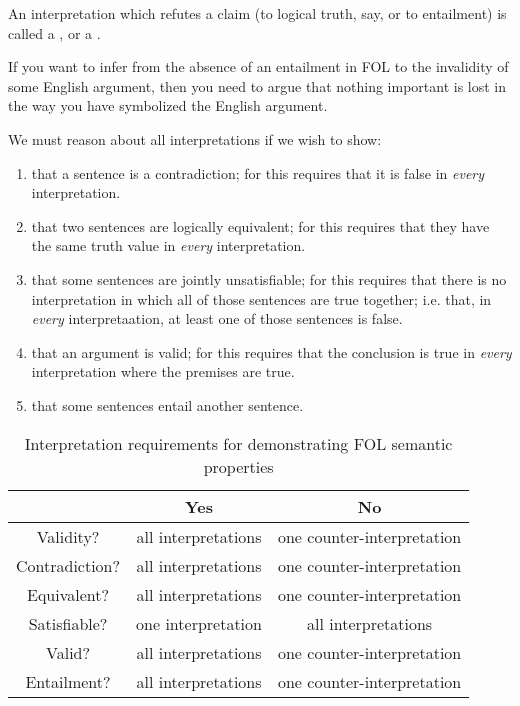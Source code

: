 \begin{definition}
    An interpretation which refutes a claim (to logical truth, say, or to entailment) is called a , or a .
\end{definition}

\begin{remark}
    If you want to infer from the absence of an entailment in FOL to the invalidity of some English argument, then you need to argue that nothing important is lost in the way you have symbolized the English argument.
\end{remark}



\begin{remark}
    We must reason about all interpretations if we wish to show: \begin{enumerate}
        \item that a sentence is a contradiction; for this requires that it is false in \emph{every} interpretation.
        \item that two sentences are logically equivalent; for this requires that they have the same truth value in \emph{every} interpretation. 
        \item that some sentences are jointly unsatisfiable; for this requires that there is no interpretation in which all of those sentences are true together; i.e. that, in \emph{every} interpretaation, at least one of those sentences is false.
        \item that an argument is valid; for this requires that the conclusion is true in \emph{every} interpretation where the premises are true.
        \item that some sentences entail another sentence.
    \end{enumerate}
\end{remark}


\begin{table}[H]
    \centering
    \caption{Interpretation requirements for demonstrating FOL semantic properties}
    \begin{tabular}{c|cc}
        & \textbf{Yes} & \textbf{No} \\ \hline
        Validity? & all interpretations & one counter-interpretation \\
        Contradiction? & all interpretations & one counter-interpretation \\
        Equivalent? & all interpretations & one counter-interpretation \\
        Satisfiable? & one interpretation & all interpretations \\
        Valid? & all interpretations & one counter-interpretation \\
        Entailment? & all interpretations & one counter-interpretation \\
    \end{tabular}
\end{table}

